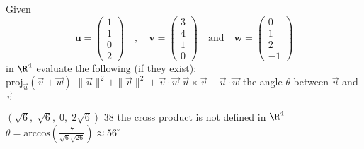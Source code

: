 
\begin{Exercise}[
name={},
title={}, 
difficulty=0,
origin={\cite{AG}}]
Given
$$
\mathbf{u}=
\begin{pmatrix}
1\\
1\\
0\\
2
\end{pmatrix}
\quad,\quad
\mathbf{v}=
\begin{pmatrix}
3\\
4\\
1\\
0
\end{pmatrix}
\quad \text{and} \quad
\mathbf{w}=
\begin{pmatrix}
0\\
1\\
2\\
-1
\end{pmatrix}
$$
in $\R^4$ evaluate the following (if they exist):\\
\Question $\text{proj}_{\vec{u}}(\vec{v}+\vec{w})$
\Question $\|\vec{u}\|^2+\|\vec{v}\|^2+\vec{v}\cdot \vec{w}$
\Question $\vec{u}\times \vec{v} -\vec{u}\cdot \vec{w}$
\Question the angle $\theta$ between $\vec{u}$ and $\vec{v}$
\end{Exercise}

\begin{Answer}
\begin{multicols}{2}
\Question $(\sqrt{6},\;\sqrt{6},\;0,\;2\sqrt{6})$
\Question $38$
\Question the cross product is not defined in $\R^4$
\Question $\theta=\text{arccos}\left(\frac{7}{\sqrt{6}\sqrt{26}}\right)\approx56^\circ$
\EndCurrentQuestion
\end{multicols}
\end{Answer}
